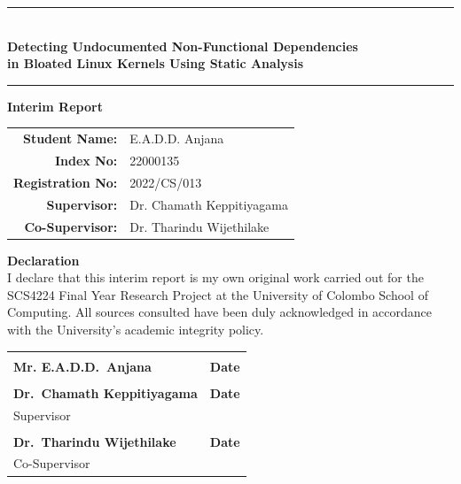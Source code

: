 \documentclass[12pt, a4paper, oneside]{book}
\begin{document}
\frontmatter
{}


\begin{titlepage}
  \centering
  \vspace*{1.5cm}

  \rule{\linewidth}{1.5pt}\\[0.4cm]
  {\LARGE\bfseries
    Detecting Undocumented Non-Functional Dependencies\\[0.3cm]
    in Bloated Linux Kernels Using Static Analysis
  }\\[0.4cm]
  \rule{\linewidth}{1.5pt}

  \vspace{1.5cm}
  {\large\bfseries Interim Report}\\[0.5cm]

  \vspace{2cm}
  \begin{tabular}{rl}
    \textbf{Student Name:}   & E.A.D.D. Anjana           \\[0.3cm]
    \textbf{Index No:}     &   22000135        \\[0.3cm]
    \textbf{Registration No:}  & 2022/CS/013                     \\[0.3cm]
    \textbf{Supervisor:}     & Dr. Chamath Keppitiyagama           \\[0.3cm]
    \textbf{Co-Supervisor:}     & Dr. Tharindu Wijethilake           \\[0.3cm]
  \end{tabular}

  \vfill
\end{titlepage}

\newpage
\thispagestyle{fancy}

{\large\bfseries Declaration}\\[4pt]
I declare that this interim report is my own original work carried out for the SCS4224 Final Year Research Project at the University of Colombo School of Computing. All sources consulted have been duly acknowledged in accordance with the University's academic integrity policy.

\vspace{2.5cm}
\begin{tabularx}{\textwidth}{X X}
\dotfill & \dotfill \\[3pt]
\textbf{Mr. E.A.D.D.\ Anjana} & \textbf{Date} \\[3cm]

\dotfill & \dotfill \\[3pt]
\textbf{Dr.\ Chamath Keppitiyagama} & \textbf{Date} \\
Supervisor & \\[3cm]

\dotfill & \dotfill \\[3pt]
\textbf{Dr.\ Tharindu Wijethilake} & \textbf{Date} \\
Co-Supervisor & \\
\end{tabularx}
\end{document}
